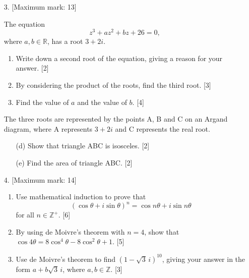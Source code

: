 \documentclass[12pt, twoside]{article}
\begin{document}
\begin{enumerate}[itemsep=0.15cm]

\newpage

\emph{Answer Problems 3--5 on lined paper.}

\item[3.] [Maximum mark: 13]

The equation
\[
z^{3} + az^{2} + bz + 26 = 0,
\]
where $a, b \in \mathbb{R}$, has a root $3 + 2i$.

\begin{enumerate}[itemsep=0.15cm]
  \item Write down a second root of the equation, giving a reason for
  your answer. \hfill [2]
  \item By considering the product of the roots, find the third root.
  \hfill [3]
  \item Find the value of $a$ and the value of $b$. \hfill [4]
\end{enumerate}

The three roots are represented by the points A, B and C on an Argand
diagram, where A represents $3 + 2i$ and C represents the real root.

\begin{enumerate}[itemsep=0.15cm]
  \item[(d)] Show that triangle ABC is isosceles. \hfill [2]
  \item[(e)] Find the area of triangle ABC. \hfill [2]
\end{enumerate}


\item[4.] [Maximum mark: 14]

\begin{enumerate}[itemsep=0.15cm]
  \item Use mathematical induction to prove that
  \[
  (\cos\theta + i\sin\theta)^{n} = \cos n\theta + i\sin n\theta
  \]
  for all $n \in \mathbb{Z}^{+}$. \hfill [6]
  \item By using de Moivre's theorem with $n = 4$, show that \\
  $\cos 4\theta = 8\cos^{4}\theta - 8\cos^{2}\theta + 1$. \hfill [5]
  \item Use de Moivre's theorem to find $\left(1 - \sqrt{3}\,i\right)^{10}$,
  giving your answer in the form $a + b\sqrt{3}\,i$, where
  $a, b \in \mathbb{Z}$. \hfill [3]
\end{enumerate}



\end{enumerate}
\end{document}
